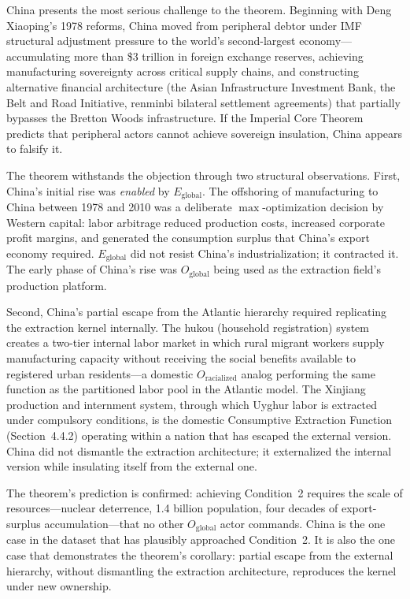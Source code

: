China presents the most serious challenge to the theorem. Beginning with Deng Xiaoping's 1978 reforms, China moved from peripheral debtor under IMF structural adjustment pressure to the world's second-largest economy---accumulating more than \$3 trillion in foreign exchange reserves, achieving manufacturing sovereignty across critical supply chains, and constructing alternative financial architecture (the Asian Infrastructure Investment Bank, the Belt and Road Initiative, renminbi bilateral settlement agreements) that partially bypasses the Bretton Woods infrastructure. If the Imperial Core Theorem predicts that peripheral actors cannot achieve sovereign insulation, China appears to falsify it.

The theorem withstands the objection through two structural observations. First, China's initial rise was \textit{enabled} by $E_{\text{global}}$. The offshoring of manufacturing to China between 1978 and 2010 was a deliberate $\max$-optimization decision by Western capital: labor arbitrage reduced production costs, increased corporate profit margins, and generated the consumption surplus that China's export economy required. $E_{\text{global}}$ did not resist China's industrialization; it contracted it. The early phase of China's rise was $O_{\text{global}}$ being used as the extraction field's production platform.

Second, China's partial escape from the Atlantic hierarchy required replicating the extraction kernel internally. The hukou (household registration) system creates a two-tier internal labor market in which rural migrant workers supply manufacturing capacity without receiving the social benefits available to registered urban residents---a domestic $O_{\text{racialized}}$ analog performing the same function as the partitioned labor pool in the Atlantic model. The Xinjiang production and internment system, through which Uyghur labor is extracted under compulsory conditions, is the domestic Consumptive Extraction Function (Section~4.4.2) operating within a nation that has escaped the external version. China did not dismantle the extraction architecture; it externalized the internal version while insulating itself from the external one.

The theorem's prediction is confirmed: achieving Condition~2 requires the scale of resources---nuclear deterrence, 1.4 billion population, four decades of export-surplus accumulation---that no other $O_{\text{global}}$ actor commands. China is the one case in the dataset that has plausibly approached Condition~2. It is also the one case that demonstrates the theorem's corollary: partial escape from the external hierarchy, without dismantling the extraction architecture, reproduces the kernel under new ownership.

